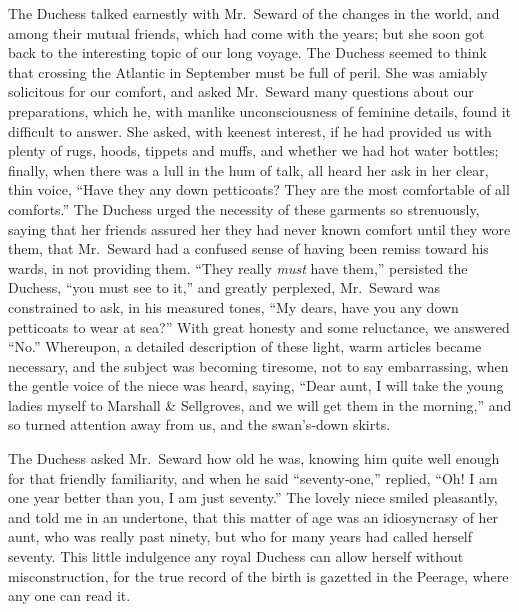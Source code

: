 \documentclass[12pt]{book}
\begin{document}
The Duchess talked earnestly with Mr.~Seward of the changes in the world,
and among their mutual friends, which had come with the years; but she soon got
back to the interesting topic of our long voyage. The Duchess seemed to think
that crossing the Atlantic in September must be full of peril. She was amiably
solicitous for our comfort, and asked Mr.~Seward many questions about our
preparations, which he, with manlike unconsciousness of feminine details, found
it difficult to answer. She asked, with keenest interest, if he had provided us with
plenty of rugs, hoods, tippets and muffs, and whether we had hot water bottles;
finally, when there was a lull in the hum of talk, all heard her ask in her clear,
thin voice, “Have they any down petticoats? They are the most comfortable of
all comforts.” The Duchess urged the necessity of these garments so strenuously,
saying that her friends assured her they had never known comfort until they
wore them, that Mr.~Seward had a confused sense of having been remiss toward
his wards, in not providing them. “They really \emph{must} have them,” persisted the
Duchess, “you must see to it,” and greatly perplexed, Mr.~Seward was constrained
to ask, in his measured tones, “My dears, have you any down petticoats to wear at
sea?” With great honesty and some reluctance, we answered “No.” Whereupon,
a detailed description of these light, warm articles became necessary, and the
subject was becoming tiresome, not to say embarrassing, when the gentle voice
of the niece was heard, saying, “Dear aunt, I will take the young ladies myself
to Marshall \& Sellgroves, and we will get them in the morning,” and so turned
attention away from us, and the swan’s‐down skirts.

The Duchess asked Mr.~Seward how old he was, knowing him quite well
enough for that friendly familiarity, and when he said “seventy‐one,” replied,
“Oh! I am one year better than you, I am just seventy.” The lovely niece smiled
pleasantly, and told me in an undertone, that this matter of age was an idiosyncrasy
of her aunt, who was really past ninety, but who for many years had called herself
seventy. This little indulgence any royal Duchess can allow herself without
misconstruction, for the true record of the birth is gazetted in the Peerage, where
any one can read it.
\end{document}
